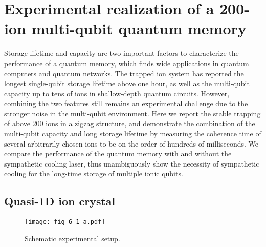 
\chapter{Experimental realization of a 200-ion multi-qubit quantum memory}

Storage lifetime and capacity are two important factors to characterize the performance of a quantum memory, which finds wide applications in quantum computers and quantum networks. The trapped ion system has reported the longest single-qubit storage lifetime above one hour, as well as the multi-qubit capacity up to tens of ions in shallow-depth quantum circuits. However, combining the two features still remains an experimental challenge due to the stronger noise in the multi-qubit environment. Here we report the stable trapping of above 200 ions in a zigzag structure, and demonstrate the combination of the multi-qubit capacity and long storage lifetime by measuring the coherence time of several arbitrarily chosen ions to be on the order of hundreds of milliseconds. We compare the performance of the quantum memory with and without the sympathetic cooling laser, thus unambiguously show the necessity of sympathetic cooling for the long-time storage of multiple ionic qubits.



\section{Quasi-1D ion crystal}

\begin{figure}
    \centering
    \texttt{[image: fig\_6\_1\_a.pdf]}
    \caption{Schematic experimental setup.}
    \label{fig:6_1_a}
\end{figure}

